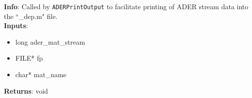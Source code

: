 \textbf{Info}: Called by \texttt{ADERPrintOutput} to facilitate printing of
ADER stream data into the ``\_dep.m" file.\\

\noindent \textbf{Inputs}:
\begin{itemize}
\item{long ader\_mat\_stream}
\item{FILE* fp}
\item{char* mat\_name}
\end{itemize}

\noindent \textbf{Returns}: void
